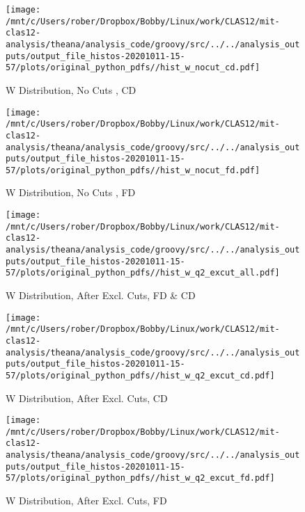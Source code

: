\documentclass{article}
\begin{document}
\begin{landscape}
    \begin{figure}[h]
        \centering

        \texttt{[image: /mnt/c/Users/rober/Dropbox/Bobby/Linux/work/CLAS12/mit-clas12-analysis/theana/analysis\_code/groovy/src/../../analysis\_outputs/output\_file\_histos-20201011-15-57/plots/original\_python\_pdfs//hist\_w\_nocut\_cd.pdf]}
        \captionsetup{textformat=empty,labelformat=blank}
        \caption{W Distribution, No Cuts , CD}
    \end{figure}
    \clearpage
    
    \begin{figure}[h]
        \centering

        \texttt{[image: /mnt/c/Users/rober/Dropbox/Bobby/Linux/work/CLAS12/mit-clas12-analysis/theana/analysis\_code/groovy/src/../../analysis\_outputs/output\_file\_histos-20201011-15-57/plots/original\_python\_pdfs//hist\_w\_nocut\_fd.pdf]}
        \captionsetup{textformat=empty,labelformat=blank}
        \caption{W Distribution, No Cuts , FD}
    \end{figure}
    \clearpage
    
    \begin{figure}[h]
        \centering

        \texttt{[image: /mnt/c/Users/rober/Dropbox/Bobby/Linux/work/CLAS12/mit-clas12-analysis/theana/analysis\_code/groovy/src/../../analysis\_outputs/output\_file\_histos-20201011-15-57/plots/original\_python\_pdfs//hist\_w\_q2\_excut\_all.pdf]}
        \captionsetup{textformat=empty,labelformat=blank}
        \caption{W Distribution, After Excl. Cuts, FD \& CD}
    \end{figure}
    \clearpage
    
    \begin{figure}[h]
        \centering

        \texttt{[image: /mnt/c/Users/rober/Dropbox/Bobby/Linux/work/CLAS12/mit-clas12-analysis/theana/analysis\_code/groovy/src/../../analysis\_outputs/output\_file\_histos-20201011-15-57/plots/original\_python\_pdfs//hist\_w\_q2\_excut\_cd.pdf]}
        \captionsetup{textformat=empty,labelformat=blank}
        \caption{W Distribution, After Excl. Cuts, CD}
    \end{figure}
    \clearpage
    
    \begin{figure}[h]
        \centering

        \texttt{[image: /mnt/c/Users/rober/Dropbox/Bobby/Linux/work/CLAS12/mit-clas12-analysis/theana/analysis\_code/groovy/src/../../analysis\_outputs/output\_file\_histos-20201011-15-57/plots/original\_python\_pdfs//hist\_w\_q2\_excut\_fd.pdf]}
        \captionsetup{textformat=empty,labelformat=blank}
        \caption{W Distribution, After Excl. Cuts, FD}
    \end{figure}
    \clearpage
    

\end{landscape}
\end{document}
